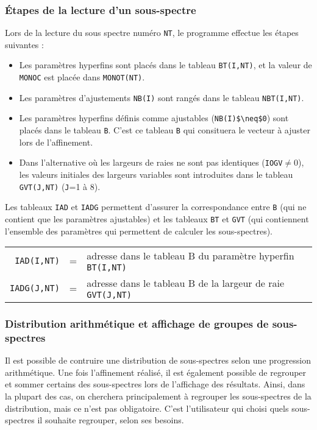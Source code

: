 \subsubsection{\'Etapes de la lecture d'un sous-spectre}
Lors de la lecture du sous spectre numéro \lstinline{NT}, le programme effectue les étapes suivantes :
\begin{itemize}
  \item Les paramètres hyperfins sont placés dans le tableau \lstinline{BT(I,NT)}, et la valeur de \lstinline{MONOC} est placée dans \lstinline{MONOT(NT)}.
  \item Les paramètres d'ajustements \lstinline{NB(I)} sont rangés dans le tableau \lstinline{NBT(I,NT)}.
  \item Les paramètres hyperfins définis comme ajustables (\lstinline{NB(I)$\neq$0}) sont placés dans le tableau \lstinline{B}.
   C'est ce tableau \lstinline{B} qui consituera le vecteur à ajuster lors de l'affinement.
  \item Dans l'alternative où les largeurs de raies ne sont pas identiques (\lstinline{IOGV}$\neq$0), les valeurs initiales des largeurs variables sont introduites dans le tableau \lstinline{GVT(J,NT)} (\lstinline{J}=1 à 8). 
\end{itemize}

Les tableaux \lstinline{IAD} et \lstinline{IADG} permettent d'assurer la correspondance entre \lstinline{B} 
(qui ne contient que les paramètres ajustables) et les tableaux \lstinline{BT} et \lstinline{GVT} (qui contiennent l'ensemble des paramètres qui permettent de calculer les sous-spectres).

\begin{tabular}{rcl}
  \lstinline{IAD(I,NT)}&=&adresse dans le tableau B  du paramètre  hyperfin \lstinline{BT(I,NT)}\\
  \lstinline{IADG(J,NT)}&=&adresse dans le tableau B de la largeur de raie \lstinline{GVT(J,NT)}\\
\end{tabular}
\subsubsection{Distribution arithmétique et affichage de groupes de sous-spectres}
Il est possible de contruire une distribution de sous-spectres selon une progression arithmétique.
Une fois l'affinement réalisé, il est également possible de regrouper et sommer certains des sous-spectres lors de l'affichage des résultats. 
Ainsi, dans la plupart des cas, on cherchera principalement à regrouper les sous-spectres de la distribution, mais ce n'est pas obligatoire.
C'est l'utilisateur qui choisi quels sous-spectres il souhaite regrouper, selon ses besoins.


